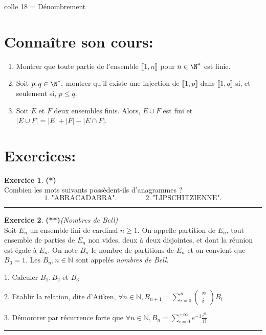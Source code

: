 \documentclass[a4paper,11pt]{article}
\theoremstyle{definition}
\newtheorem{exo}{Exercice} %
\begin{document}
	
	
	\begin{center}
		\Large \sc colle 18 = Dénombrement
	\end{center}
\raggedright


\section*{Connaître son cours:}
\begin{enumerate}
	\item Montrer que toute partie de l'ensemble $\llbracket1,n\rrbracket$ pour $n\in\N^*$ est finie.
	\item Soit $p , q \in \N^*,$ montrer qu'il existe une injection de $\llbracket1,p\rrbracket$ dans $\llbracket1,q\rrbracket$ si, et seulement si, $p \leq q $.
	\item Soit $E$ et $F$ deux ensembles finis. Alors, $E \cup F$ est fini et $\displaystyle |E \cup F | = |E | + |F | - |E \cap F |$.
\end{enumerate}

\section*{Exercices:} 	


\begin{exo}\textbf{(*)}\quad\\[0.2cm]
	Combien les mots suivants possèdent-ils d’anagrammes ?
	$$1.\ \text{"ABRACADABRA".} \quad \quad \quad \quad 2.\ \text{"LIPSCHITZIENNE".}$$
	
	
	\centering\rule{1\linewidth}{0.6pt}\end{exo}
	
\begin{exo}\textbf{(**)}\quad\textit{(Nombres de Bell)}\\[0.25cm]%
	Soit $E_{n}$ un ensemble fini de cardinal $n \geq 1$. On appelle partition de $E_{n}$, tout ensemble de parties de $E_{n}$ non vides, deux à deux disjointes, et dont la réunion est égale à $E_{n}$. On note $B_{n}$ le nombre de partitions de $E_{n}$ et on convient que $B_{0}=1$. Les $B_{n}, n \in \mathbb{N}$ sont appelés \emph{nombres de Bell}.
	
	1. Calculer $B_{1}, B_{2}$ et $B_{3}$
	
	2. Etablir la relation, dite d'Aitken, $\displaystyle\forall n \in \mathbb{N}, B_{n+1}=\sum_{i=0}^{n}\left(\begin{array}{c}n \\ i\end{array}\right) B_{i}$
	
	3. Démontrer par récurrence forte que $\displaystyle\forall n \in \mathbb{N}, B_{n}=\sum_{i=0}^{+\infty} e^{-1} \frac{i^{n}}{i !}$
	
	\centering
	\rule{1\linewidth}{0.6pt}
\end{exo}
\end{document}
